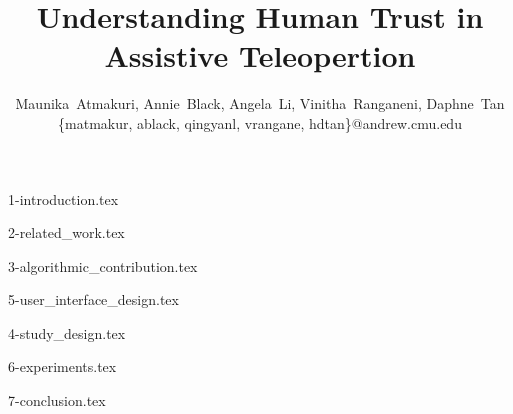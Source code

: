 \documentclass[letterpaper]{article} %
\begin{document}
%
\title{Understanding Human Trust in Assistive Teleopertion}
\author{Maunika~Atmakuri, Annie~Black, Angela~Li, Vinitha~Ranganeni, Daphne~Tan\\
\{matmakur, ablack, qingyanl, vrangane, hdtan\}@andrew.cmu.edu}
\maketitle

{1-introduction.tex}

{2-related_work.tex}

{3-algorithmic_contribution.tex}

{5-user_interface_design.tex}

{4-study_design.tex}

{6-experiments.tex}

{7-conclusion.tex}













\end{document}
